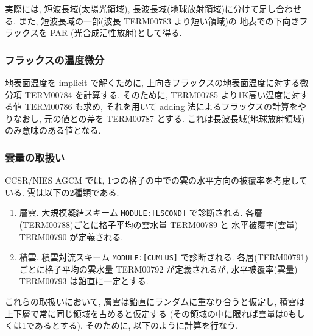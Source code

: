 実際には, 短波長域(太陽光領域), 
長波長域(地球放射領域)に分けて足し合わせる.
また, 短波長域の一部(波長 TERM00783 より短い領域)の
地表での下向きフラックスを PAR (光合成活性放射)として得る.

\subsubsection{フラックスの温度微分}

地表面温度を implicit で解くために,
上向きフラックスの地表面温度に対する微分項
TERM00784 を計算する.
そのために, TERM00785 より1K高い温度に対する値 
TERM00786 も求め, それを用いて
adding 法によるフラックスの計算をやりなおし,
元の値との差を TERM00787 とする.
これは長波長域(地球放射領域)のみ意味のある値となる.

\subsubsection{雲量の取扱い}

CCSR/NIES AGCM では,
1つの格子の中での雲の水平方向の被覆率を考慮している.
雲は以下の2種類である.
\begin{enumerate}
\item 層雲. 大規模凝結スキーム \texttt{MODULE:[LSCOND]} で診断される.
      各層(TERM00788)ごとに格子平均の雲水量 TERM00789 と
      水平被覆率(雲量) TERM00790 が定義される.      
\item 積雲. 積雲対流スキーム \texttt{MODULE:[CUMLUS]} で診断される.
      各層(TERM00791)ごとに格子平均の雲水量 TERM00792 が定義されるが,
      水平被覆率(雲量) TERM00793 は鉛直に一定とする.
\end{enumerate}
これらの取扱いにおいて, 層雲は鉛直にランダムに重なり合うと仮定し,
積雲は上下層で常に同じ領域を占めると仮定する
(その領域の中に限れば雲量は0もしくは1であるとする).
そのために, 以下のように計算を行なう.

